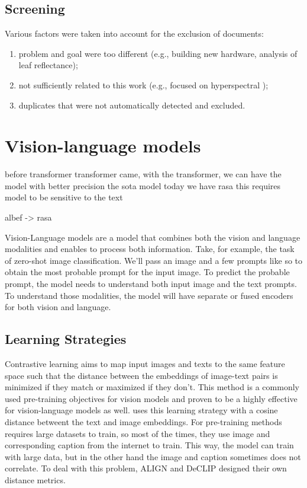 \subsection{Screening}

Various factors were taken into account for the exclusion of documents:
\begin{enumerate}
    \item problem and goal were too different (e.g., building new hardware, analysis of leaf reflectance);
    \item not sufficiently related to this work (e.g., focused on hyperspectral );
    \item duplicates that were not automatically detected and excluded.
\end{enumerate}


\section{Vision-language models}
before transformer
transformer came, 
with the transformer, we can have the model with better precision
the sota model today we have rasa 
this requires model to be sensitive to the text 

albef -> rasa

Vision-Language models are a model that combines both the vision and language modalities and enables to process both information. 
Take, for example, the task of zero-shot image classification. We’ll pass an image and a few prompts like so to obtain the most probable prompt for the input image.
To predict the probable prompt, the model needs to understand both input image and the text prompts. To understand those modalities, the model will have separate or fused encoders for both vision and language.


\subsection{Learning Strategies}
Contrastive learning aims to map input images and texts to the same feature space such that the distance between the embeddings of image-text pairs is minimized if they match or maximized if they don’t. This method is a commonly used pre-training objectives for vision models and proven to be a highly effective for vision-language models as well. \cite{radford2021learning} uses this learning strategy with a cosine distance betweent the text and image embeddings. For pre-training methods requires large datasets to train, so most of the times, they use image and corresponding caption from the internet to train. This way, the model can train with large data, but in the other hand the image and caption sometimes does not correlate. To deal with this problem, ALIGN\cite{jia2021scaling} and DeCLIP\cite{li2022supervision} designed their own distance metrics.


